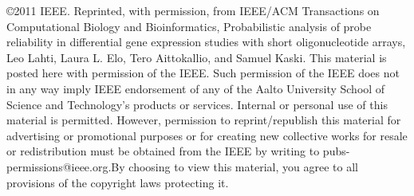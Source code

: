\documentclass[12pt,onecolumn]{article}
\begin{document}
\noindent \copyright 2011 IEEE. Reprinted, with permission, from
  IEEE/ACM Transactions on Computational Biology and Bioinformatics,
  Probabilistic analysis of probe reliability in differential gene
  expression studies with short oligonucleotide arrays, Leo Lahti,
  Laura L. Elo, Tero Aittokallio, and Samuel Kaski. This material is
  posted here with permission of the IEEE. Such permission of the IEEE
  does not in any way imply IEEE endorsement of any of the Aalto
  University School of Science and Technology's products or services.
  Internal or personal use of this material is permitted.  However,
  permission to reprint/republish this material for advertising or
  promotional purposes or for creating new collective works for resale
  or redistribution must be obtained from the IEEE by writing to
  pubs-permissions@ieee.org.By choosing to view this material, you
  agree to all provisions of the copyright laws protecting it.
\end{document}
